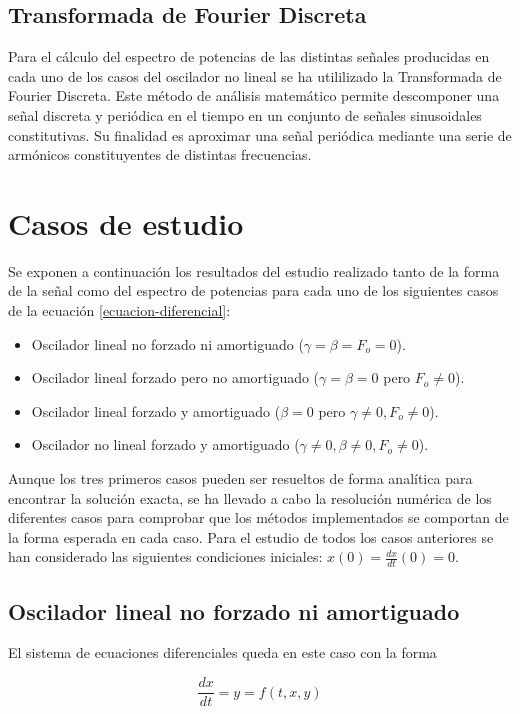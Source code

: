 \documentclass[11pt]{article}
\begin{document}
\subsection{Transformada de Fourier Discreta}
Para el cálculo del espectro de potencias de las distintas señales producidas en cada uno de los casos del oscilador no lineal se ha utililizado la Transformada de Fourier Discreta. Este método de análisis matemático permite descomponer una señal discreta y periódica en el tiempo en un conjunto de señales sinusoidales constitutivas. Su finalidad es aproximar una señal periódica mediante una serie de armónicos constituyentes de distintas frecuencias.

\section{Casos de estudio}
Se exponen a continuación los resultados del estudio realizado tanto de la forma de la señal como del espectro de potencias para cada uno de los siguientes casos de la ecuación \ref{ecuacion-diferencial}:

\begin{itemize}
	\item Oscilador lineal no forzado ni amortiguado ($\gamma = \beta = F_o = 0$).
	\item Oscilador lineal forzado pero no amortiguado ($\gamma = \beta = 0$ pero $F_o \neq 0$).
	\item Oscilador lineal forzado y amortiguado ($\beta = 0$ pero $\gamma \neq 0, F_o \neq0$).
	\item Oscilador no lineal forzado y amortiguado ($\gamma \neq 0, \beta \neq 0, F_o \neq 0$).
\end{itemize}

Aunque los tres primeros casos pueden ser resueltos de forma analítica para encontrar la solución exacta, se ha llevado a cabo la resolución numérica de los diferentes casos para comprobar que los métodos implementados se comportan de la forma esperada en cada caso. Para el estudio de todos los casos anteriores se han considerado las siguientes condiciones iniciales: $x(0) = \frac{dx}{dt}(0) = 0$.

\subsection{Oscilador lineal no forzado ni amortiguado}
El sistema de ecuaciones diferenciales queda en este caso con la forma 

\begin{equation}
	\frac{dx}{dt} = y = f(t, x, y)
\end{equation}
\end{document}

